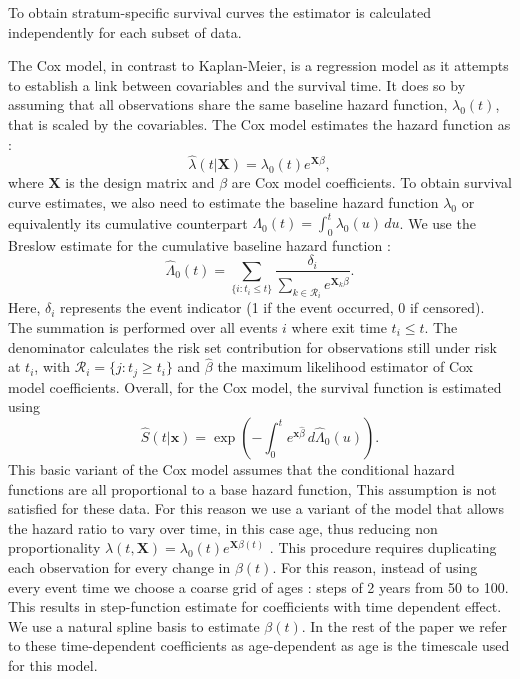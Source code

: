 \documentclass[risks,article,submit,moreauthors,pdftex]{Definitions/mdpi}
\begin{document}
To obtain stratum-specific survival curves the estimator is calculated
independently for each subset of data.

The Cox model, in contrast to Kaplan-Meier, is a regression model as it
attempts to establish a link between covariables and the survival time.
It does so by assuming that all observations share the same baseline
hazard function, \(\lambda_0(t)\), that is scaled by the covariables.
The Cox model estimates the hazard function as : \begin{equation}
\hat{\lambda}(t | \mathbf{X}) = \lambda_0(t) e^{\mathbf{X}\beta},
\end{equation} where \(\mathbf{X}\) is the design matrix and \(\beta\)
are Cox model coefficients. To obtain survival curve estimates, we also
need to estimate the baseline hazard function \(\lambda_0\) or
equivalently its cumulative counterpart
\(\Lambda_{0}(t) = \int_0^t \lambda_0(u)\,du\). We use the Breslow
estimate for the cumulative baseline hazard function : \begin{equation}
\hat{\Lambda}_{0}(t) = 
  \sum_{\{i : t_i \leq t\}}
      \frac{\delta_i}{
        \sum_{k \in \mathcal{R}_i} e^{\mathbf{X}_k\hat{\beta}}}.
\end{equation} Here, \(\delta_i\) represents the event indicator (1 if
the event occurred, 0 if censored). The summation is performed over all
events \(i\) where exit time \(t_i \leq t\). The denominator calculates
the risk set contribution for observations still under risk at \(t_i\),
with \(\mathcal{R}_i = \{j : t_j \geq t_i\}\) and \(\hat{\beta}\) the
maximum likelihood estimator of Cox model coefficients. Overall, for the
Cox model, the survival function is estimated using \begin{equation}
\hat{S}(t | \mathbf{x}) = \exp\left(-\int_0^t e^{\mathbf{x}\hat{\beta}} \, d\hat{\Lambda}_0(u)\right).
\end{equation} This basic variant of the Cox model assumes that the
conditional hazard functions are all proportional to a base hazard
function, This assumption is not satisfied for these data. For this
reason we use a variant of the model that allows the hazard ratio to
vary over time, in this case age, thus reducing non proportionality
\(\lambda(t, \mathbf{X}) = \lambda_{0}(t)e^{\mathbf{X}\beta(t)}\)
\citep{martinussen_dynamic_2006}. This procedure requires duplicating
each observation for every change in \(\beta(t)\). For this reason,
instead of using every event time we choose a coarse grid of ages :
steps of 2 years from 50 to 100. This results in step-function estimate
for coefficients with time dependent effect. We use a natural spline
basis to estimate \(\beta(t)\). In the rest of the paper we refer to
these time-dependent coefficients as age-dependent as age is the
timescale used for this model.
\end{document}
